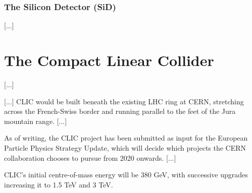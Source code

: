 \subsubsection{The Silicon Detector (SiD)}
[...]

\section{The Compact Linear Collider}
[...]

[...] CLIC would be built beneath the existing LHC ring at CERN, stretching across the French-Swiss border and running parallel to the feet of the Jura mountain range. [...]

As of writing, the CLIC project has been submitted as input for the European Particle Physics Strategy Update, which will decide which projects the CERN collaboration chooses to pursue from 2020  onwards. [...]

CLIC's initial centre-of-mass energy will be 380 GeV, with successive upgrades increasing it to 1.5 TeV and 3 TeV. 